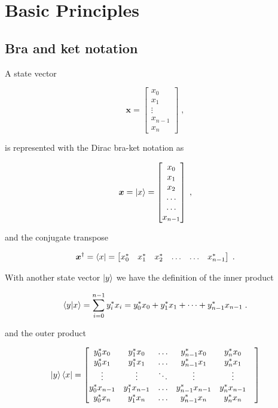 \section{Basic Principles}
\subsection{Bra and ket notation}

A state vector

\begin{equation}
    \boldsymbol{x} = \begin{bmatrix} x_0 \\ x_1 \\ \vdots \\ x_{n-1} \\ x_n \end{bmatrix} \; ,
\end{equation}

is represented with the Dirac bra-ket notation as

\begin{equation}
    \boldsymbol{x} = \ket{x} = \begin{bmatrix} x_0\\ x_1 \\ x_2 \\ \dots \\ \dots \\ x_{n-1} \end{bmatrix} \; ,
\end{equation}

and the conjugate transpose

\begin{equation}
  \boldsymbol{x}^{\dagger} = \bra{x} = \begin{bmatrix} x_0^* & x_1^* & x_2^* & \dots & \dots & x_{n-1}^* \end{bmatrix} \; .
\end{equation}

With another state vector $\ket{y}$ we have the definition of the inner product

\begin{equation}
    \bra{y}\ket{x} = \sum_{i=0}^{n-1} y_i^*x_i=y_0^*x_0+y_1^*x_1+\dots + y_{n-1}^*x_{n-1} \; .
\end{equation}

and the outer product

\begin{equation}
    \ket{y}\bra{x} = \begin{bmatrix}
        y_{0}^*x_0 & y_{1}^*x_0 & \dots & y_{n-1}^*x_0 & y_{n}^*x_0 & \\y_{0}^*x_{1} & y_{1}^*x_{1} & \dots & y_{n-1}^*x_{1}  &  y_{n}^*x_{1} & \\ \vdots & \vdots & \ddots & \vdots & \vdots \\y_{0}^*x_{n-1} & y_{1}^*x_{n-1} & \dots & y_{n-1}^*x_{n-1} & y_{n}^*x_{n-1} & \\y_{0}^*x_{n} & y_{1}^*x_{n} & \dots & y_{n-1}^*x_{n} & y_{n}^*x_{n}
    \end{bmatrix}
\end{equation}

